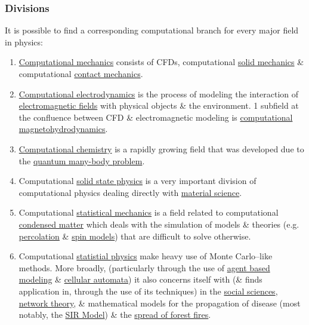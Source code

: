 \documentclass{article}
\begin{document}
\subsubsection{Divisions}
It is possible to find a corresponding computational branch for every major field in physics:
\begin{enumerate}
	\item \href{https://en.wikipedia.org/wiki/Computational_mechanics}{Computational mechanics} consists of CFDs, computational \href{https://en.wikipedia.org/wiki/Solid_mechanics}{solid mechanics} \& computational \href{https://en.wikipedia.org/wiki/Contact_mechanics}{contact mechanics}.
	\item \href{https://en.wikipedia.org/wiki/Computational_electrodynamics}{Computational electrodynamics} is the process of modeling the interaction of \href{https://en.wikipedia.org/wiki/Electromagnetic_fields}{electromagnetic fields} with physical objects \& the environment. 1 subfield at the confluence between CFD \& electromagnetic modeling is \href{https://en.wikipedia.org/wiki/Computational_magnetohydrodynamics}{computational magnetohydrodynamics}.
	\item \href{https://en.wikipedia.org/wiki/Computational_chemistry}{Computational chemistry} is a rapidly growing field that was developed due to the \href{https://en.wikipedia.org/wiki/Quantum_many-body_problem}{quantum many-body problem}.
	\item Computational \href{https://en.wikipedia.org/wiki/Solid_state_physics}{solid state physics} is a very important division of computational physics dealing directly with \href{https://en.wikipedia.org/wiki/Material_science}{material science}.
	\item Computational \href{https://en.wikipedia.org/wiki/Statistical_mechanics}{statistical mechanics} is a field related to computational \href{https://en.wikipedia.org/wiki/Condensed_matter}{condensed matter} which deals with the simulation of models \& theories (e.g. \href{https://en.wikipedia.org/wiki/Percolation}{percolation} \& \href{https://en.wikipedia.org/wiki/Spin_model}{spin models}) that are difficult to solve otherwise.
	\item Computational \href{https://en.wikipedia.org/wiki/Statistical_physics}{statistial physics} make heavy use of Monte Carlo--like methods. More broadly, (particularly through the use of \href{https://en.wikipedia.org/wiki/Agent_based_modeling}{agent based modeling} \& \href{https://en.wikipedia.org/wiki/Cellular_automata}{cellular automata}) it also concerns itself with (\& finds application in, through the use of its techniques) in the \href{https://en.wikipedia.org/wiki/Social_sciences}{social sciences}, \href{https://en.wikipedia.org/wiki/Network_theory}{network theory}, \& mathematical models for the propagation of disease (most notably, the \href{https://en.wikipedia.org/wiki/Compartmental_models_in_epidemiology#SIR_Model_on_Networks}{SIR Model}) \& the \href{https://en.wikipedia.org/wiki/Wildfire_modeling}{spread of forest fires}.

\end{enumerate}
\end{document}
